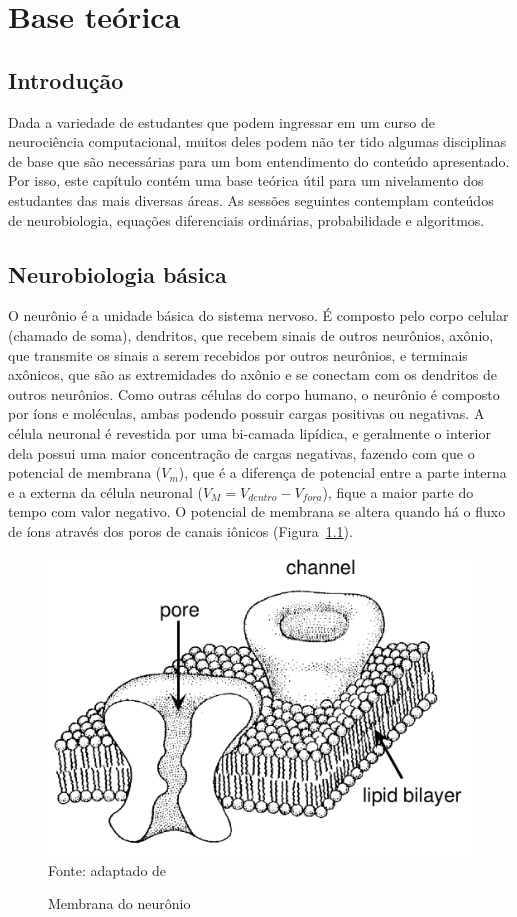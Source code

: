\chapter{Base teórica}\label{cap:teoria}
\section{Introdução}\label{sec:teoria_intro}
Dada a variedade de estudantes que podem ingressar em um curso de neurociência computacional, muitos deles podem não ter tido algumas disciplinas de base que são necessárias para um bom entendimento do conteúdo apresentado. Por isso, este capítulo contém uma base teórica útil para um nivelamento dos estudantes das mais diversas áreas. As sessões seguintes contemplam conteúdos de neurobiologia, equações diferenciais ordinárias, probabilidade e algoritmos.

\section{Neurobiologia básica}\label{sec:fisiologia}
O neurônio é a unidade básica do sistema nervoso. É composto pelo corpo celular (chamado de soma), dendritos, que recebem sinais de outros neurônios, axônio, que transmite os sinais a serem recebidos por outros neurônios, e terminais axônicos, que são as extremidades do axônio e se conectam com os dendritos de outros neurônios. Como outras células do corpo humano, o neurônio é composto por íons e moléculas, ambas podendo possuir cargas positivas ou negativas. A célula neuronal é revestida por uma bi-camada lipídica, e geralmente o interior dela possui uma maior concentração de cargas negativas, fazendo com que o potencial de membrana ($V_m$), que é a diferença de potencial entre a parte interna e a externa da célula neuronal ($V_M=V_{dentro}-V_{fora}$), fique a maior parte do tempo com valor negativo. O potencial de membrana se altera quando há o fluxo de íons através dos poros de canais iônicos (Figura~\ref{fig:membrananeuronio}).

\begin{figure}[tb]
	\centering
	\caption[Membrana do neurônio]{Membrana do neurônio}
	\includegraphics[width=0.55\linewidth]{figs/membrana_neuronio}
	\label{fig:membrananeuronio}
	\\
	Fonte: adaptado de \cite{hille_ionic_1992}
\end{figure}

